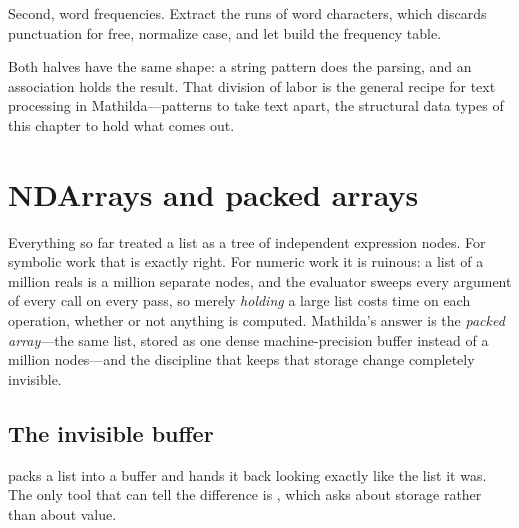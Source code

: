 Second, word frequencies. Extract the runs of word characters, which discards
punctuation for free, normalize case, and let  build the frequency table.

\begin{codepairs}
\end{codepairs}

Both halves have the same shape: a string pattern does the parsing, and an
association holds the result. That division of labor is the general recipe for text
processing in Mathilda---patterns to take text apart, the structural data types of
this chapter to hold what comes out.

\section{NDArrays and packed arrays}
\label{sec:ds-packed}

Everything so far treated a list as a tree of independent expression nodes. For
symbolic work that is exactly right. For numeric work it is ruinous: a list of a
million reals is a million separate nodes, and the evaluator sweeps every argument of
every call on every pass, so merely \emph{holding} a large list costs time on each
operation, whether or not anything is computed. Mathilda's answer is the
\emph{packed array}---the same list, stored as one dense
machine-precision buffer instead of a million nodes---and the discipline that keeps
that storage change completely invisible.

\subsection{The invisible buffer}
\label{ssec:ds-invisible}

 packs a list into a buffer and hands it back looking exactly like the
list it was. The only tool that can tell the difference is , which asks
about storage rather than about value.

\begin{codepairs}
\end{codepairs}

